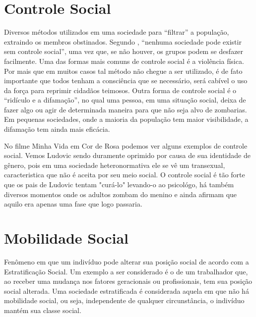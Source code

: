 \documentclass[
	12pt,				%
	openany,
	oneside,			%
	a4paper,			%
	chapter=TITLE,		%
	english,			%
	brazil				%
]{abntex2}
\begin{document}

\frenchspacing

\pretextual

\imprimircapa

\imprimirfolhaderosto

\tableofcontents*
\cleardoublepage

\textual

\chapter{Controle Social}
Diversos métodos utilizados em uma sociedade para “filtrar” a população, extraindo os membros obstinados. Segundo , “nenhuma sociedade pode existir sem controle social”, uma vez que, se não houver, os grupos podem se desfazer facilmente. Uma das formas mais comuns de controle social é a violência física. Por mais que em muitos casos tal método não chegue a ser utilizado, é de fato importante que todos tenham a consciência que se necessário, será cabível o uso da força para reprimir cidadãos teimosos. Outra forma de controle social é o “ridículo e a difamação”, no qual uma pessoa, em uma situação social, deixa de fazer algo ou agir de determinada maneira para que não seja alvo de zombarias. Em pequenas sociedades, onde a maioria da população tem maior visibilidade, a difamação tem ainda mais eficácia.

No filme Minha Vida em Cor de Rosa \cite{minhaVidaEmCorDeRosa} podemos ver alguns exemplos de controle social. Vemos Ludovic sendo duramente oprimido por causa de sua identidade de gênero, pois em uma sociedade heteronormativa ele se vê um transexual, caracteristica que não é aceita por seu meio social. O controle social é tão forte que os pais de Ludovic tentam "curá-lo" levando-o ao psicológo, há também diversos momentos onde os adultos zombam do menino e ainda afirmam que aquilo era apenas uma fase que logo passaria.

\chapter{Mobilidade Social}
Fenômeno em que um indivíduo pode alterar sua posição social de acordo com a Estratificação Social. Um exemplo a ser considerado é o de um trabalhador que, ao receber uma mudança nos fatores geracionais ou profissionais, tem sua posição social alterada. Uma sociedade estratificada é considerada aquela em que não há mobilidade social, ou seja, independente de qualquer circunstância, o indivíduo mantém sua classe social.
\end{document}
